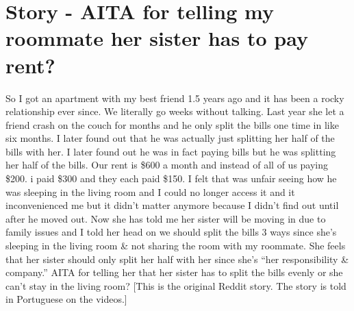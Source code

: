 \section{Story - AITA for telling my roommate her sister has to pay rent?}
So I got an apartment with my best friend 1.5 years ago and it has been a rocky relationship ever since. We literally go weeks without talking. Last year she let a friend crash on the couch for months and he only split the bills one time in like six months. I later found out that he was actually just splitting her half of the bills with her. I later found out he was in fact paying bills but he was splitting her half of the bills. Our rent is \$600 a month and instead of all of us paying \$200. i paid \$300 and they each paid \$150. I felt that was unfair seeing how he was sleeping in the living room and I could no longer access it and it inconvenienced me but it didn’t matter anymore because I didn’t find out until after he moved out. Now she has told me her sister will be moving in due to family issues and I told her head on we should split the bills 3 ways since she’s sleeping in the living room \& not sharing the room with my roommate. She feels that her sister should only split her half with her since she’s “her responsibility \& company.” AITA for telling her that her sister has to split the bills evenly or she can’t stay in the living room?
[This is the original Reddit story. The story is told in Portuguese on the videos.]

\clearpage
